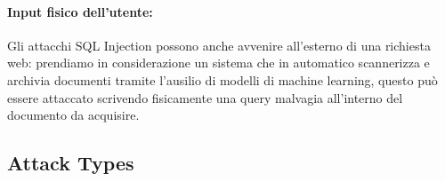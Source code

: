 \paragraph{Input fisico dell'utente:}
Gli attacchi SQL Injection possono anche avvenire all'esterno di una richiesta
web: prendiamo in considerazione un sistema che in automatico scannerizza e
archivia documenti tramite l'ausilio di modelli di machine learning, questo può
essere attaccato scrivendo fisicamente una query malvagia all'interno del
documento da acquisire.


\subsection{Attack Types} %


